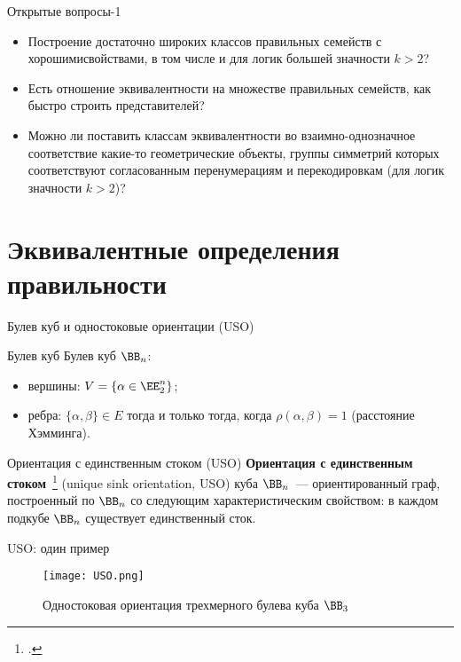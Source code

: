 \begin{frame}{Открытые вопросы-1}
    \begin{itemize}
        \item Построение достаточно широких классов правильных семейств с \guillemotleft хорошими\guillemotright свойствами, в том числе и для логик большей значности $k > 2$?
        \pause 
        \item Есть отношение эквивалентности на множестве правильных семейств, как быстро строить представителей?
        \pause 
        \item Можно ли поставить классам эквивалентности во взаимно-однозначное соответствие какие-то геометрические объекты, группы симметрий которых соответствуют согласованным перенумерациям и перекодировкам (для логик значности $k > 2$)?
    \end{itemize}
\end{frame}


\section{Эквивалентные определения правильности}


\begin{frame}{Булев куб и одностоковые ориентации (USO)}
    \begin{block}{Булев куб}
        Булев куб $\BB_n$:
        \begin{itemize}
            \item вершины: $V = \{ \alpha \in \EE_2^n \}$;
            \pause
            \item ребра: $\{\alpha, \beta \} \in E$ тогда и только тогда, когда $\rho(\alpha, \beta) = 1$ (расстояние Хэмминга).
        \end{itemize}
    \end{block}
    \pause 
    \begin{block}{Ориентация с единственным стоком (USO)}
        \textbf{Ориентация с единственным стоком}~\footcite{szabo2001} (unique sink orientation, USO) куба $\BB_n$~--- ориентированный граф, построенный по $\BB_n$ со следующим характеристическим свойством: в каждом подкубе $\BB_n$ существует единственный сток.
    \end{block}
\end{frame}  

  
\begin{frame}{USO: один пример}
    \begin{figure}
          \centering
          \texttt{[image: USO.png]}
          \caption{Одностоковая ориентация трехмерного булева куба $\BB_3$}
    \end{figure}
\end{frame}


